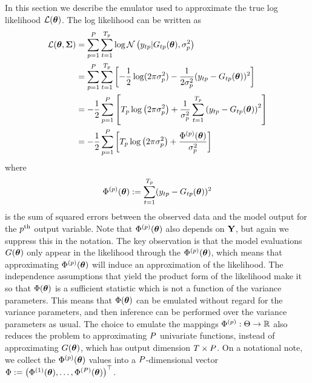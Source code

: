 \documentclass[12pt]{article}
\begin{document}
In this section we describe the emulator used to approximate the true log likelihood $\mathcal{L}(\boldsymbol{\theta})$. The log likelihood can be written as 
\begin{align*}
\mathcal{L}(\boldsymbol{\theta}, \boldsymbol{\Sigma}) &= \sum_{p = 1}^{P} \sum_{t = 1}^{T_{p}} \log \mathcal{N}\left(y_{t p}| G_{t p}(\boldsymbol{\theta}), \sigma_{p}^2 \right) \\
	         &= \sum_{p = 1}^{P}  \sum_{t = 1}^{T_{p}} \left[-\frac{1}{2} \log(2\pi \sigma_{p}^2) - \frac{1}{2\sigma_{p}^2} (y_{t p} - G_{t p}(\boldsymbol{\theta}))^2\right]  \\
	         &= -\frac{1}{2} \sum_{p = 1}^{P} \left[T_{p} \log\left(2\pi \sigma_{p}^2 \right) + \frac{1}{\sigma_{p}^2}\sum_{t = 1}^{T_{p}} \left(y_{t p} - 
	                G_{t p}(\boldsymbol{\theta})\right)^2  \right] \\
	         &= -\frac{1}{2} \sum_{p = 1}^{P} \left[T_{p} \log\left(2\pi \sigma_{p}^2 \right) + \frac{\Phi^{(p)}(\boldsymbol{\theta})}{\sigma_{p}^2} \right] 
\end{align*}
where 
\[\Phi^{(p)}(\boldsymbol{\theta}) := \sum_{t = 1}^{T_{p}} (y_{t p} - G_{t p}(\boldsymbol{\theta}))^2\]
is the sum of squared errors between the observed data and the model output for the $p^{\text{th}}$ output variable. Note that $\Phi^{(p)}(\boldsymbol{\theta})$ also depends on $\mathbf{Y}$, but again we suppress this in the notation. The key observation 
is that the model evaluations $G(\boldsymbol{\theta})$ only appear in the likelihood through the $\Phi^{(p)}(\boldsymbol{\theta})$, which means that approximating $\Phi^{(p)}(\boldsymbol{\theta})$ will induce an approximation of the likelihood. The independence assumptions 
that yield the product form of the likelihood make it so that $\Phi(\boldsymbol{\theta})$ is a sufficient statistic which is not a function of the variance parameters. This means that $\Phi(\boldsymbol{\theta})$ can be emulated without regard for the variance parameters, 
and then inference can be performed over the variance parameters as usual. The choice to emulate the mappings $\Phi^{(p)}: \Theta \to \mathbb{R}$ also reduces the problem to 
approximating $P$ univariate functions, instead of approximating $G(\boldsymbol{\theta})$, which has output dimension $T \times P$. On a notational note, we collect the $\Phi^{(p)}(\boldsymbol{\theta})$ values into a $P$-dimensional 
vector $\Phi := \begin{pmatrix} \Phi^{(1)}(\boldsymbol{\theta}), \dots, \Phi^{(P)}(\boldsymbol{\theta}) \end{pmatrix}^\top$.  
\end{document}
